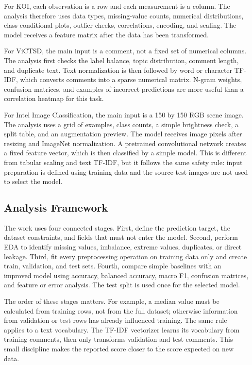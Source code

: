 \documentclass[oneside]{hcmut-report}
\begin{document}
For KOI, each observation is a row and each measurement is a column. The analysis therefore uses data types, missing-value counts, numerical distributions, class-conditional plots, outlier checks, correlations, encoding, and scaling. The model receives a feature matrix after the data has been transformed.

For ViCTSD, the main input is a comment, not a fixed set of numerical columns. The analysis first checks the label balance, topic distribution, comment length, and duplicate text. Text normalization is then followed by word or character TF-IDF, which converts comments into a sparse numerical matrix. N-gram weights, confusion matrices, and examples of incorrect predictions are more useful than a correlation heatmap for this task.

For Intel Image Classification, the main input is a 150 by 150 RGB scene image. The analysis uses a grid of examples, class counts, a simple brightness check, a split table, and an augmentation preview. The model receives image pixels after resizing and ImageNet normalization. A pretrained convolutional network creates a fixed feature vector, which is then classified by a simple model. This is different from tabular scaling and text TF-IDF, but it follows the same safety rule: input preparation is defined using training data and the source-test images are not used to select the model.

\subsection*{Analysis Framework}

The work uses four connected stages. First, define the prediction target, the dataset constraints, and fields that must not enter the model. Second, perform EDA to identify missing values, imbalance, extreme values, duplicates, or direct leakage. Third, fit every preprocessing operation on training data only and create train, validation, and test sets. Fourth, compare simple baselines with an improved model using accuracy, balanced accuracy, macro F1, confusion matrices, and feature or error analysis. The test split is used once for the selected model.

The order of these stages matters. For example, a median value must be calculated from training rows, not from the full dataset; otherwise information from validation or test rows has already influenced training. The same rule applies to a text vocabulary. The TF-IDF vectorizer learns its vocabulary from training comments, then only transforms validation and test comments. This small discipline makes the reported score closer to the score expected on new data.
\end{document}
